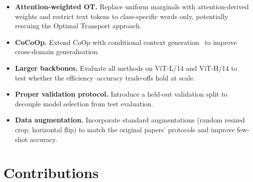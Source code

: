 \documentclass[10pt,twocolumn,letterpaper]{article}
\begin{document}
\begin{itemize}
  \item \textbf{Attention-weighted OT.}  Replace uniform marginals with
    attention-derived weights and restrict text tokens to class-specific
    words only, potentially rescuing the Optimal Transport approach.
  \item \textbf{CoCoOp.}  Extend CoOp with conditional context
    generation~\cite{zhou2022conditional} to improve cross-domain
    generalisation.
  \item \textbf{Larger backbones.}  Evaluate all methods on ViT-L/14 and
    ViT-H/14 to test whether the efficiency--accuracy trade-offs hold at
    scale.
  \item \textbf{Proper validation protocol.}  Introduce a held-out
    validation split to decouple model selection from test evaluation.
  \item \textbf{Data augmentation.}  Incorporate standard augmentations
    (random resized crop, horizontal flip) to match the original papers'
    protocols and improve few-shot accuracy.
\end{itemize}


\section{Contributions}\label{sec:contributions}

\end{document}
